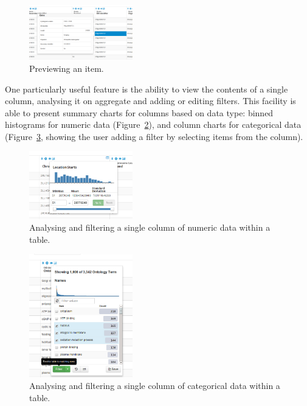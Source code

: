 \documentclass[10pt,a4paper,twocolumn]{article}
\begin{document}
\begin{figure}[htb]
\centering
\includegraphics[width=0.4\textwidth]{preview-gene.png}
\caption{\label{fig:preview} Previewing an item.}
\end{figure}

One particularly useful feature is the ability to view the contents of a
single column, analysing it on aggregate and adding or editing filters. This
facility is able to present summary charts for columns based on data type:
binned histograms for numeric data (Figure~\ref{fig:column-summary}), and
column charts for categorical data (Figure~\ref{fig:cat-column-summary},
showing the user adding a filter by selecting items from the column).

\begin{figure}[t]
\centering
\includegraphics[width=0.4\textwidth]{im-tables-column-summary.png}
\caption{
    \label{fig:column-summary}
    Analysing and filtering a single column of numeric data within a table.
}
\end{figure}

\begin{figure}[t]
\centering
\includegraphics[width=0.4\textwidth]{category-column-summary.png}
\caption{
    \label{fig:cat-column-summary}
    Analysing and filtering a single column of categorical data within a table.
}
\end{figure}
\end{document}

